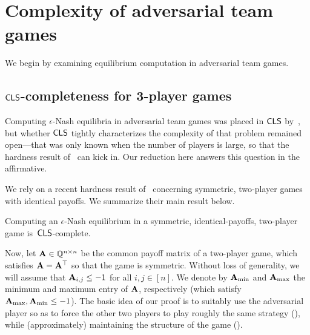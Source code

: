 \section{Complexity of adversarial team games}

We begin by examining equilibrium computation in adversarial team games.

\subsection{$\mathsf{CLS}$-completeness for 3-player games}
\label{sec:cls}

Computing $\epsilon$-Nash equilibria in adversarial team games was placed in $\mathsf{CLS}$ by~\citet{Anagnostides23:Algorithms}, but whether $\mathsf{CLS}$ tightly characterizes the complexity of that problem remained open---that was only known when the number of players is large, so that the hardness result of~\citet{Babichenko21:Settling} can kick in. Our reduction here answers this question in the affirmative. 

We rely on a recent hardness result of~\citet{ghosh2024complexitysymmetricbimatrixgames} concerning symmetric, two-player games with identical payoffs. We summarize their main result below.

\begin{theorem}
    \label{theorem:hard-2cls}
    Computing an $\epsilon$-Nash equilibrium in a symmetric, identical-payoffs, two-player game is~$\mathsf{CLS}$-complete.
\end{theorem}

Now, let $\mathbf{A} \in \mathbb{Q}^{n \times n}$ be the common payoff matrix of a two-player game, which satisfies $\mathbf{A} = \mathbf{A}^\top$ so that the game is symmetric. Without loss of generality, we will assume that $\mathbf{A}_{i, j} \leq -1$ for all $i, j \in [n]$. We denote by $\mathbf{A}_{\min}$ and $\mathbf{A}_{\max}$ the minimum and maximum entry of $\mathbf{A}$, respectively (which satisfy $\mathbf{A}_{\max}, \mathbf{A}_{\min} \leq -1$). The basic idea of our proof is to suitably use the adversarial player so as to force the other two players to play roughly the same strategy (), while (approximately) maintaining the structure of the game ().

